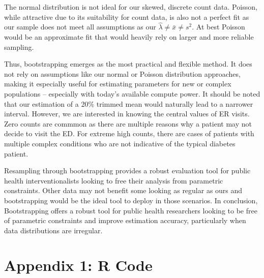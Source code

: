 \documentclass[
]{article}
\begin{document}
The normal distribution is not ideal for our skewed, discrete count
data. Poisson, while attractive due to its suitability for count data,
is also not a perfect fit as our sample does not meet all assumptions as
our \(\hat{ \lambda } \neq \bar{x} \neq s^{2}\). At best Poisson would
be an approximate fit that would heavily rely on larger and more
reliable sampling.

Thus, bootstrapping emerges as the most practical and flexible method.
It does not rely on assumptions like our normal or Poisson distribution
approaches, making it especially useful for estimating parameters for
new or complex populations -- especially with today's available compute
power. It should be noted that our estimation of a 20\% trimmed mean
would naturally lead to a narrower interval. However, we are interested
in knowing the central values of ER visits. Zero counts are commmon as
there are multiple reasons why a patient may not decide to visit the ED.
For extreme high counts, there are cases of patients with multiple
complex conditions who are not indicative of the typical diabetes
patient.

Resampling through bootstrapping provides a robust evaluation tool for
public health interventionalists looking to free their analysis from
parametric constraints. Other data may not benefit some looking as
regular as ours and bootstrapping would be the ideal tool to deploy in
those scenarios. In conclusion, Bootstrapping offers a robust tool for
public health researchers looking to be free of parametric constraints
and improve estimation accuracy, particularly when data distributions
are irregular.

\newpage

\section{Appendix 1: R Code}\label{appendix-1-r-code}
\end{document}
